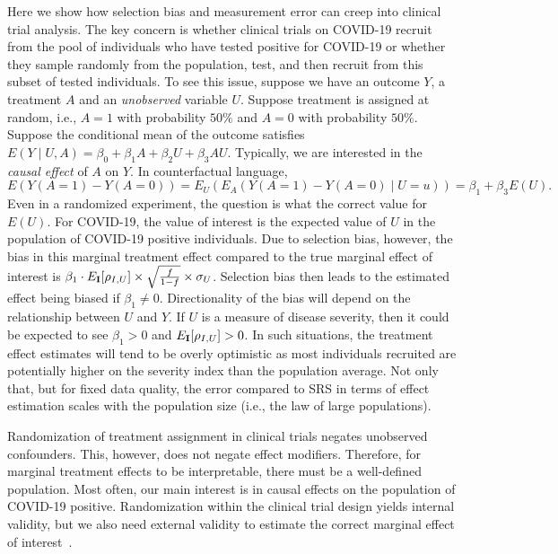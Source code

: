 \documentclass[12pt]{article}
\def\I{{\bf I}}
\begin{document}
Here we show how selection bias and measurement error can creep into clinical trial analysis. The key concern is whether clinical trials on COVID-19 recruit from the pool of individuals who have tested positive for COVID-19 or whether they sample randomly from the population, test, and then recruit from this subset of tested individuals.  To see this issue, suppose we have an outcome $Y$, a treatment $A$ and an \emph{unobserved} variable $U$.  Suppose treatment is assigned at random, i.e., $A =1$ with probability $50\%$ and $A=0$ with probability $50\%$.  Suppose the conditional mean of the outcome satisfies  $E(Y \mid U, A ) = \beta_0 + \beta_1 A + \beta_2 U + \beta_3 A U$.  Typically, we are interested in the \emph{causal effect} of $A$ on $Y$.  In counterfactual language,
$$
E( Y(A=1) - Y(A=0) ) = E_U ( E_A ( Y(A=1) - Y(A=0) \mid U=u ))
= \beta_1 + \beta_3 E(U).
$$
Even in a randomized experiment, the question is what the correct value for $E(U)$. For COVID-19, the value of interest is the expected value of $U$ in the population of COVID-19 positive individuals.  Due to selection bias, however, the bias in this marginal treatment effect compared to the true marginal effect of interest is $\beta_1 \cdot E_{\I} [ \rho_{I,U} ] \times \sqrt{ \frac{f}{1-f} } \times \sigma_U$.  Selection bias then leads to the estimated effect being biased if $\beta_1 \neq 0$.  Directionality of the bias will depend on the relationship between $U$ and $Y$.  If $U$ is a measure of disease severity, then it could be expected to see $\beta_1 > 0$ and $E_{\I} [ \rho_{I, U} ] >0$.  In such situations, the treatment effect estimates will tend to be overly optimistic as most individuals recruited are potentially higher on the severity index than the population average.  Not only that, but for fixed data quality, the error compared to SRS in terms of effect estimation scales with the population size (i.e., the law of large populations).

Randomization of treatment assignment in clinical trials negates unobserved confounders.  This, however, does not negate effect modifiers.  Therefore, for marginal treatment effects to be interpretable, there must be a well-defined population.  Most often, our main interest is in causal effects on the population of COVID-19 positive.  Randomization within the clinical trial design yields internal validity, but we also need external validity to estimate the correct marginal effect of interest~\cite{Keiding2016}.


\end{document}

